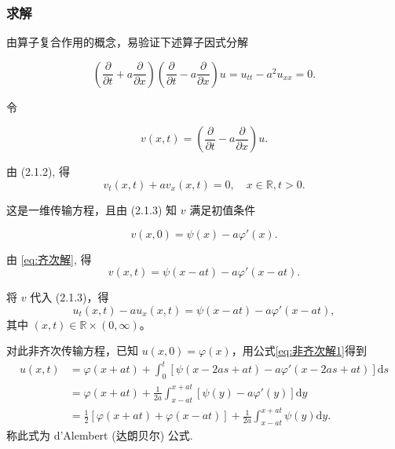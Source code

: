 \documentclass[12pt,a4paper]{article}
\numberwithin{subsection}{section}   %
\numberwithin{subsubsection}{subsection}
\theoremstyle{plain}
\theoremstyle{definition}
\theoremstyle{remark}
\theoremstyle{remark}
\begin{document}
\subsubsection{求解}
	由算子复合作用的概念，易验证下述算子因式分解
	
	\begin{equation}
		\left( \frac{\partial}{\partial t} + a \frac{\partial}{\partial x} \right) \left( \frac{\partial}{\partial t} - a \frac{\partial}{\partial x} \right) u = u_{tt} - a^2 u_{xx} = 0.
	\end{equation}
	
	令
	
	\begin{equation}
		v(x, t) = \left( \frac{\partial}{\partial t} - a \frac{\partial}{\partial x} \right) u.
	\end{equation}
	
	由 (2.1.2), 得
	\begin{equation}
	v_t(x, t) + a v_x(x, t) = 0, \quad x \in \mathbb{R}, t > 0.
\end{equation}
	
	这是一维传输方程，且由 (2.1.3) 知 \(v\) 满足初值条件
	
	\begin{equation}
	v(x, 0) = \psi(x) - a \varphi'(x).
\end{equation}
	
	由 \eqref{eq:齐次解}, 得
	\begin{equation}
		v(x, t) = \psi(x - a t) - a \varphi'(x - a t).
	\end{equation}
	
	将 \(v\) 代入 (2.1.3)，得
	\begin{equation}
		u_t(x, t) - a u_x(x, t) = \psi(x - a t) - a \varphi'(x - a t),
	\end{equation}
	其中 \((x, t) \in \mathbb{R} \times (0, \infty)\)。
	
	对此非齐次传输方程，已知 \(u(x, 0) = \varphi(x)\)，用公式\eqref{eq:非齐次解1}得到
	\begin{equation}\label{eq:达朗贝尔公式}
		\begin{aligned}
			u(x, t) &= \varphi(x + a t) + \int_0^t \left[ \psi(x - 2 a s + a t) - a \varphi'(x - 2 a s + a t) \right] \mathrm{d}s \\
			&= \varphi(x + a t) + \frac{1}{2 a} \int_{x - a t}^{x + a t} \left[ \psi(y) - a \varphi'(y) \right] \mathrm{d}y \\
			&= \frac{1}{2} \left[ \varphi(x + a t) + \varphi(x - a t) \right] + \frac{1}{2 a} \int_{x - a t}^{x + a t} \psi(y) \mathrm{d}y.
		\end{aligned}
	\end{equation}
	称此式为 d'Alembert (达朗贝尔) 公式.
	
\end{document}
